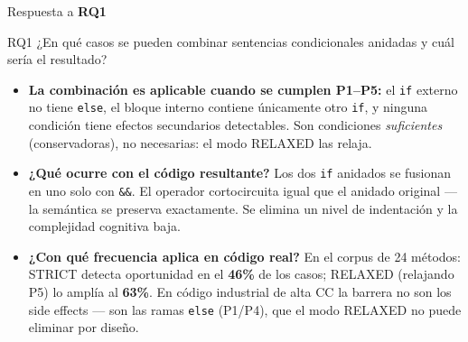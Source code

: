 \documentclass[aspectratio=169, 10pt]{beamer}
\newcommand{\ok}[1]{\textcolor{okgreen}{\textbf{#1}}}
\newcommand{\rq}[1]{\textbf{RQ#1}}
\begin{document}
\begin{frame}{Respuesta a \rq{1}}
  \begin{block}{RQ1}
    ¿En qué casos se pueden combinar sentencias condicionales anidadas
    y cuál sería el resultado?
  \end{block}

  \vspace{0.4em}
  \begin{itemize}
    \item \textbf{La combinación es aplicable cuando se cumplen P1--P5:}
          el \texttt{if} externo no tiene \texttt{else}, el bloque interno
          contiene únicamente otro \texttt{if}, y ninguna condición tiene
          efectos secundarios detectables. Son condiciones \emph{suficientes}
          (conservadoras), no necesarias: el modo RELAXED las relaja.

    \item \textbf{¿Qué ocurre con el código resultante?}
          Los dos \texttt{if} anidados se fusionan en uno solo con
          \texttt{\&\&}. El operador cortocircuita igual que el anidado
          original --- la semántica se preserva exactamente. Se elimina un
          nivel de indentación y la complejidad cognitiva baja.

    \item \textbf{¿Con qué frecuencia aplica en código real?}
          En el corpus de 24 métodos: STRICT detecta oportunidad en el
          \ok{46\%} de los casos; RELAXED (relajando P5) lo amplía al
          \ok{63\%}. En código industrial de alta CC la barrera no son los
          side effects --- son las ramas \texttt{else} (P1/P4), que el
          modo RELAXED no puede eliminar por diseño.
  \end{itemize}
\end{frame}
\end{document}
